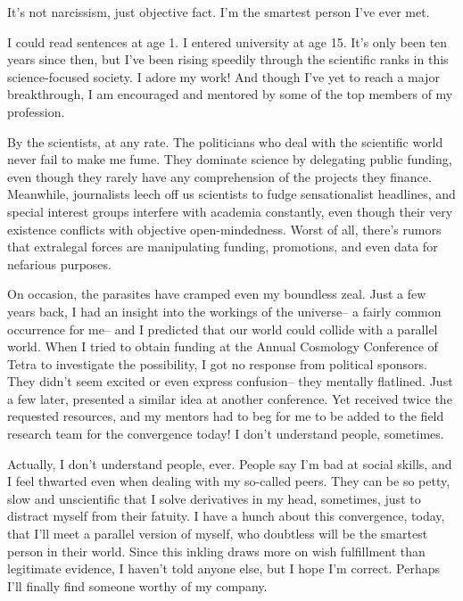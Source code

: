 \documentclass[char]{guildcamp3}
\begin{document}
\name{\cSciTwo{}}

\updatemacro{\cNPC}{
  \unknownplayer %
  }



It's not narcissism, just objective fact. I'm the smartest person I've ever met.

I could read sentences at age 1. I entered university at age 15. It's only been ten years since then, but I've been rising speedily through the scientific ranks in this science-focused society. I adore my work! And though I've yet to reach a major breakthrough, I am encouraged and mentored by some of the top members of my profession.

By the scientists, at any rate. The politicians who deal with the scientific world never fail to make me fume. They dominate science by delegating public funding, even though they rarely have any comprehension of the projects they finance. Meanwhile, journalists leech off us scientists to fudge sensationalist headlines, and special interest groups interfere with academia constantly, even though their very existence conflicts with objective open-mindedness. Worst of all, there's rumors that extralegal forces are manipulating funding, promotions, and even data for nefarious purposes.

On occasion, the parasites have cramped even my boundless zeal. Just a few years back, I had an insight into the workings of the universe-- a fairly common occurrence for me-- and I predicted that our world could collide with a parallel world. When I tried to obtain funding at the Annual Cosmology Conference of Tetra to investigate the possibility, I got no response from political sponsors. They didn't seem excited or even express confusion-- they mentally flatlined. Just a few later, \cSciOne{} presented a similar idea at another conference. Yet \cSciOne{\they} received twice the requested resources, and my mentors had to beg for me to be added to the field research team for the convergence today! I don't understand people, sometimes.

Actually, I don't understand people, ever. People say I'm bad at social skills, and I feel thwarted even when dealing with my so-called peers. They can be so petty, slow and unscientific that I solve derivatives in my head, sometimes, just to distract myself from their fatuity. I have a hunch about this convergence, today, that I'll meet a parallel version of myself, who doubtless will be the smartest person in their world. Since this inkling draws more on wish fulfillment than legitimate evidence, I haven't told anyone else, but I hope I'm correct. Perhaps I'll finally find someone worthy of my company.
\end{document}
